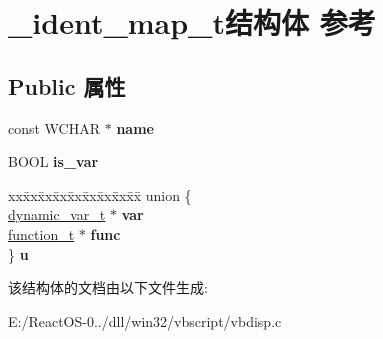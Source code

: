 \hypertarget{struct__ident__map__t}{}\section{\+\_\+ident\+\_\+map\+\_\+t结构体 参考}
\label{struct__ident__map__t}
\subsection*{Public 属性}
\begin{DoxyCompactItemize}
\item 
\mbox{\label{struct__ident__map__t_a87e3ed62c8f221552d8f975f00bdd0b5}} 
const W\+C\+H\+AR $\ast$ {\bfseries name}
\item 
\mbox{\label{struct__ident__map__t_ae9bd141e3e5359e88ddaeb562c839c60}} 
B\+O\+OL {\bfseries is\+\_\+var}
\item 
\mbox{\label{struct__ident__map__t_a75ac55c36b78c2be6ab47953552d1712}} 
\begin{tabbing}
xx\=xx\=xx\=xx\=xx\=xx\=xx\=xx\=xx\=\kill
union \{\\
\>\hyperlink{struct__dynamic__var__t}{dynamic\_var\_t} $\ast$ {\bfseries var}\\
\>\hyperlink{struct__function__t}{function\_t} $\ast$ {\bfseries func}\\
\} {\bfseries u}\\

\end{tabbing}\end{DoxyCompactItemize}


该结构体的文档由以下文件生成\+:\begin{DoxyCompactItemize}
\item 
E\+:/\+React\+O\+S-\/0../dll/win32/vbscript/vbdisp.\+c\end{DoxyCompactItemize}
